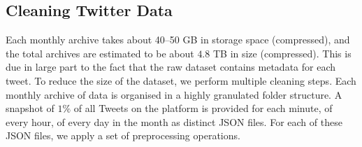 \documentclass{paper}
\newcommand{\inlineSection}[1]{\vspace{0.5em}\noindent\textbf{#1.}~}
\begin{document}


\subsection{Cleaning Twitter Data}
\label{sec:data_cleaning}

Each monthly archive takes about 40--50 GB in storage space (compressed), and the total archives are estimated to be about $4.8$ TB in size (compressed). This is due in large part to the fact that the raw dataset contains metadata for each tweet. To reduce the size of the dataset, we perform multiple cleaning steps. Each monthly archive of data is organised in a highly granulated folder structure. A snapshot of $1\%$ of all Tweets on the platform is provided for each minute, of every hour, of every day in the month as distinct JSON files. For each of these JSON files, we apply a set of preprocessing operations.
\end{document}
